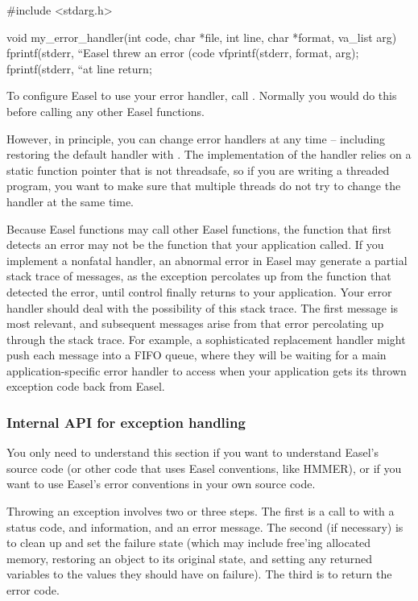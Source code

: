 \begin{cchunk}
#include <stdarg.h>

void
my_error_handler(int code, char *file, int line, char *format, va_list arg)
{
  fprintf(stderr, ``Easel threw an error (code %
  vfprintf(stderr, format, arg);
  fprintf(stderr, ``at line %
  return;
}
\end{cchunk}

To configure Easel to use your error handler, call
. Normally you
would do this before calling any other Easel functions.

However, in principle, you can change error handlers at any time --
including restoring the default handler with
.  The implementation of
the handler relies on a static function pointer that is not
threadsafe, so if you are writing a threaded program, you want to make
sure that multiple threads do not try to change the handler at the
same time.

Because Easel functions may call other Easel functions, the function
that first detects an error may not be the function that your
application called.  If you implement a nonfatal handler, an abnormal
error in Easel may generate a partial stack trace of
 messages, as the exception percolates up from
the function that detected the error, until control finally returns to
your application. Your error handler should deal with the possibility
of this stack trace. The first  message is most
relevant, and subsequent messages arise from that error percolating up
through the stack trace.  For example, a sophisticated replacement
 handler might push each 
message into a FIFO queue, where they will be waiting for a main
application-specific error handler to access when your application
gets its thrown exception code back from Easel.

\subsubsection{Internal API for exception handling}

You only need to understand this section if you want to understand
Easel's source code (or other code that uses Easel conventions, like
HMMER), or if you want to use Easel's error conventions in your own
source code.

Throwing an exception involves two or three steps. The first is a call
to  with a status code,  and
 information, and an error message. The second (if
necessary) is to clean up and set the failure state (which may include
free'ing allocated memory, restoring an object to its original state,
and setting any returned variables to the values they should have on
failure). The third is to return the error code.


